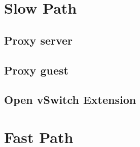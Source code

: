 \section{Slow Path}

\subsection{Proxy server}

\subsection{Proxy guest}

\subsection{Open vSwitch Extension}

\section{Fast Path}